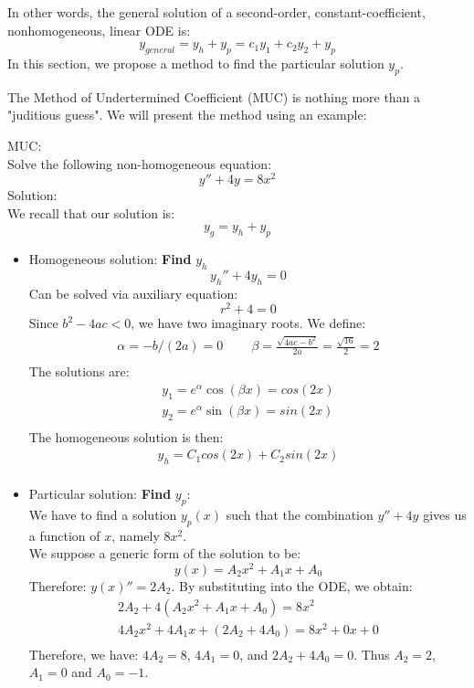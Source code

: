 In other words, the general solution of a second-order, constant-coefficient, nonhomogeneous, linear ODE is:
\begin{equation}
y_{general}=y_{h} + y_{p} = c_1y_1+c_2y_2 + y_p
\end{equation}
In this section, we propose a method to find the particular solution $y_p$.


The Method of Undertermined Coefficient (MUC) is nothing more than a "juditious guess". We will present the method using an example:

\begin{exmp}{MUC:}\\
Solve the following non-homogeneous equation:
\begin{equation}
y''+4y=8x^2
\end{equation}
Solution:\\
We recall that our solution is:
\begin{equation}
y_{g}=y_{h} + y_{p} 
\end{equation}
\begin{itemize}
\item Homogeneous solution:
\textbf{Find} $y_h$\\
\begin{equation}
y_h''+4y_h=0
\end{equation}
Can be solved via auxiliary equation:
\begin{equation}
r^2+4=0
\end{equation}
Since $b^2-4ac<0$, we have two imaginary roots. We define:
\begin{align*}
\alpha=-b/(2a) = 0\ \qquad \beta=\frac{\sqrt{4ac-b^2}}{2a}=\frac{\sqrt{16}}{2}=2\\
\end{align*}
The solutions are:
\begin{align*}
y_1=e^\alpha\cos(\beta x)=cos(2x)\\
y_2=e^\alpha\sin(\beta x)=sin(2x)\\
\end{align*}
The homogeneous solution is then:
\begin{align*}
y_h=C_1 cos(2x)+C_2 sin(2x)\\
\end{align*}
\item Particular solution:
\textbf{Find} $y_p$:\\
We have to find a solution $y_p(x)$ such that the combination $y''+4y$ gives us a function of $x$, namely $8x^2$.\\
We suppose a generic form of the solution to be:
\begin{equation}
y(x)= A_2x^2+A_1x+A_0
\end{equation}
Therefore: $y(x)''= 2A_2$.
By substituting into the ODE, we obtain:
\begin{align*}
2A_2+4(A_2x^2+A_1x+A_0)=8x^2\\
4A_2x^2 +4A_1 x+ (2A_2+4A_0)=8x^2 + 0x + 0\\
\end{align*}
Therefore, we have: $4A_2=8$, $4A_1=0$, and $2A_2+4A_0=0$. Thus $A_2=2$, $A_1=0$ and $A_0=-1$.


\end{itemize}
\end{exmp}
